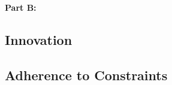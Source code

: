 \documentclass{report}
\begin{document}
\textbf{Part B:}
\label{sec:description-b}





\subsection{Innovation}
\label{sec:innovation}





\subsection{Adherence to Constraints}
\label{sec:constraints}

\end{document}

